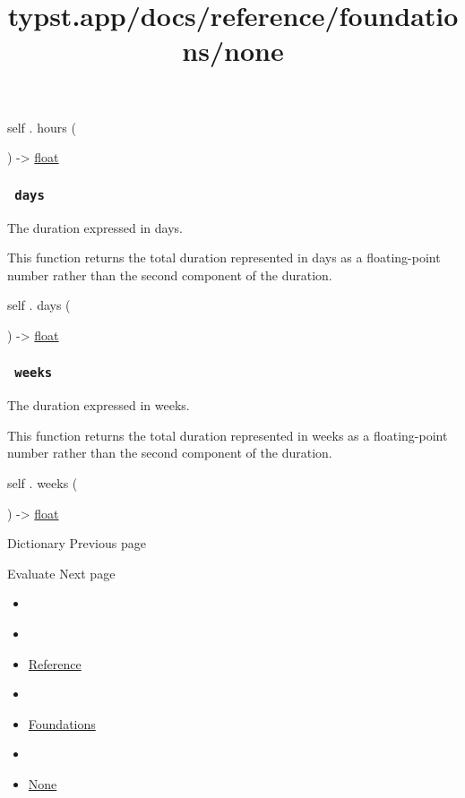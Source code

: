 self { . } { hours } (

) -\textgreater{} \href{/docs/reference/foundations/float/}{float}

\subsubsection{\texorpdfstring{\texttt{\ days\ }}{ days }}\label{definitions-days}

The duration expressed in days.

This function returns the total duration represented in days as a
floating-point number rather than the second component of the duration.

self { . } { days } (

) -\textgreater{} \href{/docs/reference/foundations/float/}{float}

\subsubsection{\texorpdfstring{\texttt{\ weeks\ }}{ weeks }}\label{definitions-weeks}

The duration expressed in weeks.

This function returns the total duration represented in weeks as a
floating-point number rather than the second component of the duration.

self { . } { weeks } (

) -\textgreater{} \href{/docs/reference/foundations/float/}{float}

\href{/docs/reference/foundations/dictionary/}{\pandocbounded{}}

{ Dictionary } { Previous page }

\href{/docs/reference/foundations/eval/}{\pandocbounded{}}

{ Evaluate } { Next page }


\title{typst.app/docs/reference/foundations/none}

\begin{itemize}
\tightlist
\item
  \href{/docs}{}
\item
  
\item
  \href{/docs/reference/}{Reference}
\item
  
\item
  \href{/docs/reference/foundations/}{Foundations}
\item
  
\item
  \href{/docs/reference/foundations/none/}{None}
\end{itemize}

